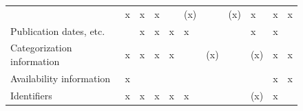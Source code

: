\documentclass{article}
\begin{document}
\begin{figure}
\begin{tabular}{lllllllllll}
& x

& x

& x

& 

& (x)

& 

& (x)

& x

& x

& x

\\
Publication dates, etc.

& 

& x

& x

& x

& x

& 

& 

& x

& x

& 

\\
Categorization information

& x

& x

& x

& x

& 

& (x)

& 

& (x)

& x

& x

\\
Availability information

& x

& 

& 

& 

& 

& 

& 

& 

& x

& x

\\
Identifiers

& x

& x

& x

& x

& x

& 

& 

& (x)

& x


\end{tabular}
\end{figure}
\end{document}
